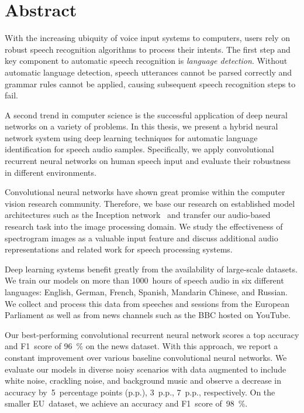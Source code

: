 \section*{\LARGE Abstract}
With the increasing ubiquity of voice input systems to computers, users rely on robust speech recognition algorithms to process their intents. The first step and key component to automatic speech recognition is \emph{language detection}. Without automatic language detection, speech utterances cannot be parsed correctly and grammar rules cannot be applied, causing subsequent speech recognition steps to fail.

A second trend in computer science is the successful application of deep neural networks on a variety of problems. In this thesis, we present a hybrid neural network system using deep learning techniques for automatic language identification for speech audio samples. Specifically, we apply convolutional recurrent neural networks on human speech input and evaluate their robustness in different environments.

Convolutional neural networks have shown great promise within the computer vision research community. Therefore, we base our research on established model architectures such as the Inception network~\cite{szegedy2015going} and transfer our audio-based research task into the image processing domain. We study the effectiveness of spectrogram images as a valuable input feature and discuss additional audio representations and related work for speech processing systems.

Deep learning systems benefit greatly from the availability of large-scale datasets. We train our models on more than \num{1000}~hours of speech audio in six different languages: English, German, French, Spanish, Mandarin Chinese, and Russian. We collect and process this data from speeches and sessions from the European Parliament as well as from news channels such as the BBC hosted on YouTube.

Our best-performing convolutional recurrent neural network scores a top accuracy and F1~score of \SI{96}{\percent} on the news dataset. With this approach, we report a constant improvement over various baseline convolutional neural networks. We evaluate our models in diverse noisy scenarios with data augmented to include white noise, crackling noise, and background music and observe a decrease in accuracy by~\num{5}~percentage points (p.p.), \num{3}~p.p., \num{7}~p.p., respectively. On the smaller EU~dataset, we achieve an accuracy and F1~score of~\SI{98}{\percent}.
